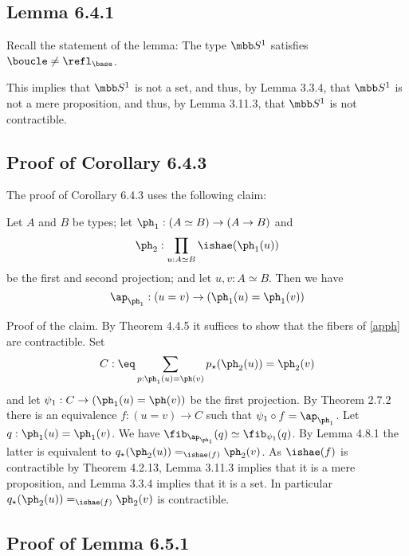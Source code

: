 \documentclass[12pt]{article}
\begin{document}
\subsection{Lemma 6.4.1}

Recall the statement of the lemma: The type $\mbb S^1$ satisfies $\boucle\neq\refl_{\base}$. 

This implies that $\mbb S^1$ is not a set, and thus, by Lemma 3.3.4, that $\mbb S^1$ is not a mere proposition, and thus, by Lemma 3.11.3, that $\mbb S^1$ is not contractible.


\subsection{Proof of Corollary 6.4.3} %


The proof of Corollary 6.4.3 uses the following claim:

\nn Let $A$ and $B$ be types; let $\ph_1:(A\simeq B)\to(A\to B)$ and 
$$
\ph_2:\prod_{u:A\simeq B}\ishae(\ph_1(u))
$$ 
be the first and second projection; and let $u,v:A\simeq B$. Then we have 
\begin{equation}\label{apph}
\ap_{\ph_1}:(u=v)\to(\ph_1(u)=\ph_1(v))
\end{equation}%

\nn Proof of the claim. By Theorem 4.4.5 it suffices to show that the fibers of \eqref{apph} are contractible. Set 
$$
C:\eq\sum_{p:\ph_1(u)=\ph(v)}p_\star(\ph_2(u))=\ph_2(v)
$$ 
and let $\psi_1:C\to(\ph_1(u)=\ph(v))$ be the first projection. By Theorem 2.7.2 there is an equivalence $f:(u=v)\to C$ such that $\psi_1\circ f=\ap_{\ph_1}$. Let $q:\ph_1(u)=\ph_1(v)$. We have $\fib_{\ap_{\ph_1}}(q)\simeq\fib_{\psi_1}(q)$. By Lemma 4.8.1 the latter is equivalent to $q_\star(\ph_2(u))=_{\ishae(f)}\ph_2(v)$. As $\ishae(f)$ is contractible by Theorem 4.2.13, Lemma 3.11.3 implies that it is a mere proposition, and Lemma 3.3.4 implies that it is a set. In particular $q_\star(\ph_2(u))=_{\ishae(f)}\ph_2(v)$ is contractible.


\subsection{Proof of Lemma 6.5.1}
\end{document}
